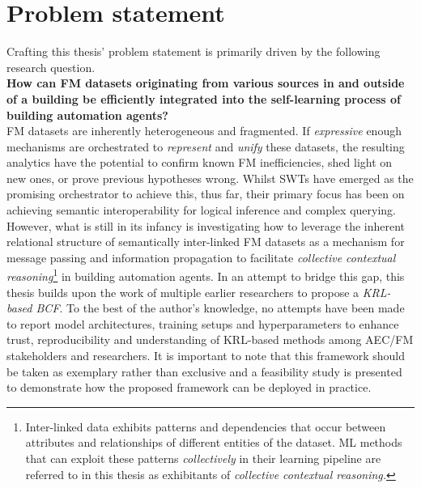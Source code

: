 \section{Problem statement}
\label{ps}

Crafting this thesis' problem statement is primarily driven by the following research question. \\

\noindent \textbf{How can \ac{FM} datasets originating from various sources in and outside of a building be efficiently integrated into the self-learning process of building automation agents?} \\

\ac{FM} datasets are inherently heterogeneous and fragmented. If \textit{expressive} enough mechanisms are orchestrated to \textit{represent} and \textit{unify} these datasets, the resulting analytics have the potential to confirm known \ac{FM} inefficiencies, shed light on new ones, or prove previous hypotheses wrong. Whilst \ac{SWT}s have emerged as the promising orchestrator to achieve this, thus far, their primary focus has been on achieving semantic interoperability for logical inference and complex querying. However, what is still in its infancy is investigating how to leverage the inherent relational structure of semantically inter-linked \ac{FM} datasets as a mechanism for message passing and information propagation to facilitate \textit{collective contextual reasoning}\footnote{Inter-linked data exhibits patterns and dependencies that occur between attributes and relationships of different entities of the dataset. \ac{ML} methods that can exploit these patterns \textit{collectively} in their learning pipeline are referred to in this thesis as exhibitants of \textit{collective contextual reasoning.}} in building automation agents. In an attempt to bridge this gap, this thesis builds upon the work of multiple earlier researchers to propose a \textit{\ac{KRL-based BCF}}. To the best of the author's knowledge, no attempts have been made to report model architectures, training setups and hyperparameters to enhance trust, reproducibility and understanding of \ac{KRL}-based methods among \ac{AEC/FM} stakeholders and researchers. It is important to note that this framework should be taken as exemplary rather than exclusive and a feasibility study is presented to demonstrate how the proposed framework can be deployed in practice.

